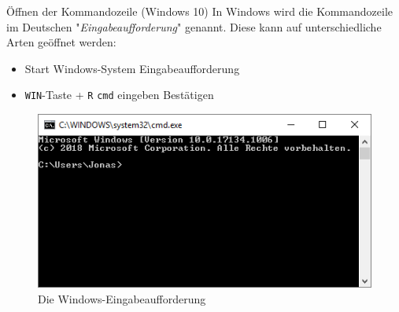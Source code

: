     
    \begin{frame}{Öffnen der Kommandozeile (Windows 10)}
        In Windows wird die Kommandozeile im Deutschen "\textit{Eingabeaufforderung}" genannt. Diese kann auf unterschiedliche Arten geöffnet werden:
        
        \begin{itemize}
            \item Start \textrightarrow Windows-System \textrightarrow Eingabeaufforderung
            \item \texttt{WIN}-Taste + \texttt{R} \textrightarrow  \texttt{cmd} eingeben \textrightarrow Bestätigen
        \end{itemize}
        
        
        \begin{figure}
            \centering
            \includegraphics[width=0.8\linewidth,height=0.5\textheight,keepaspectratio]{chapters/05_command_line/figures/cmd_win.png}
            \caption{Die Windows-Eingabeaufforderung}
        \end{figure}
        
    \end{frame}
    

